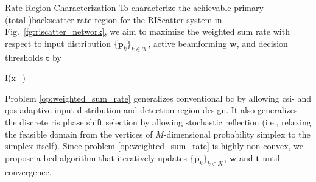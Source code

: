 \documentclass[journal]{IEEEtran}
\begin{document}
\begin{section}{Rate-Region Characterization}
	To characterize the achievable primary-(total-)backscatter rate region for the RIScatter system in Fig.~\ref{fg:riscatter_network}, we aim to maximize the weighted sum rate with respect to input distribution $\{\boldsymbol{p}_k\}_{k \in \mathcal{K}}$, active beamforming $\boldsymbol{w}$, and decision thresholds $\boldsymbol{t}$ by
	\begin{maxi!}
		{}{I(x_{})}{\label{op:weighted_sum_rate}}{\label{ob:weighted_sum_rate}}
	\end{maxi!}

	Problem \eqref{op:weighted_sum_rate} generalizes conventional \gls{bc} by allowing \gls{csi}- and \gls{qos}-adaptive input distribution and detection region design.
	It also generalizes the discrete \gls{ris} phase shift selection by allowing stochastic reflection (i.e., relaxing the feasible domain from the vertices of $M$-dimensional probability simplex to the simplex itself).
	Since problem \eqref{op:weighted_sum_rate} is highly non-convex, we propose a \gls{bcd} algorithm that iteratively updates $\{\boldsymbol{p}_k\}_{k \in \mathcal{K}}$, $\boldsymbol{w}$ and $\boldsymbol{t}$ until convergence.


\end{section}
\end{document}
